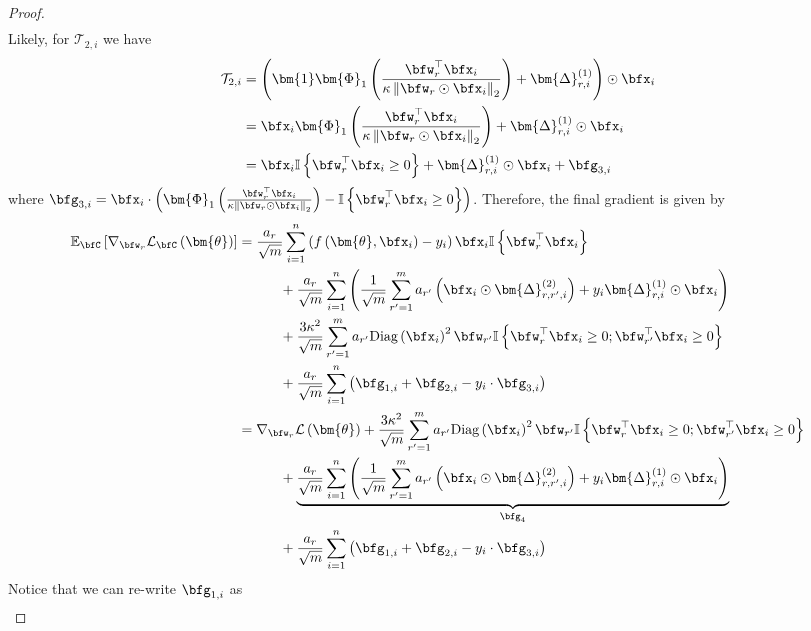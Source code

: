 \documentclass[10pt]{article} %
\theoremstyle{definition}
\theoremstyle{plain}
\newcommand{\paren}[1]{\left(#1\right)}
\newcommand{\norm}[1]{\left\|#1\right\|}
\newcommand{\indy}[1]{\mathbb{I}\left\{#1\right\}}
\providecommand{\E}{\mathbb{E}}
\def\calL{{\mathcal{L}}}
\begin{document}
\begin{proof}
\begin{gather*}
    \end{gather*}
    Likely, for $\mathcal{T}_{2,i}$ we have
    \begin{align*}
        \mathcal{T}_{2,i} & = \paren{\bm{1}\bm{\Phi}_1\paren{\frac{\bfw_r^\top\bfx_i}{\kappa\norm{\bfw_r\odot\bfx_i}_2}}+\bm{\Delta}^{(1)}_{r,i}}\odot\bfx_i\\
        & = \bfx_i\bm{\Phi}_1\paren{\frac{\bfw_r^\top\bfx_i}{\kappa\norm{\bfw_r\odot\bfx_i}_2}} + \bm{\Delta}^{(1)}_{r,i}\odot\bfx_i\\
        & = \bfx_i\indy{\bfw_r^\top\bfx_i\geq 0} + \bm{\Delta}^{(1)}_{r,i}\odot\bfx_i + \bfg_{3,i}
    \end{align*}
    where $\bfg_{3,i} = \bfx_i\cdot \paren{\bm{\Phi}_1\paren{\frac{\bfw_r^\top\bfx_i}{\kappa\norm{\bfw_r\odot\bfx_i}_2}} - \indy{\bfw_r^\top\bfx_i\geq 0}}$.
    Therefore, the final gradient is given by
    \begin{align*}
        \E_{\bfC}\left[\nabla_{\bfw_r}\calL_{\bfC}\paren{\bm{\theta}}\right] & = \frac{a_r}{\sqrt{m}}\sum_{i=1}^n\paren{f\paren{\bm{\theta},\bfx_i} -y_i}\bfx_i\mathbb{I}\left\{\bfw_{r}^\top\bfx_i\right\}\\
        &\quad\quad\quad + \frac{a_r}{\sqrt{m}}\sum_{i=1}^n\paren{\frac{1}{\sqrt{m}}\sum_{r'=1}^ma_{r'}\paren{\bfx_i\odot \bm{\Delta}_{r,r',i}^{(2)}} + y_i\bm{\Delta}^{(1)}_{r,i}\odot\bfx_i}\\
        &\quad\quad\quad + \frac{3\kappa^2}{\sqrt{m}}\sum_{r'=1}^ma_{r'}\text{Diag}\paren{\bfx_i}^2\bfw_{r'}\mathbb{I}\left\{\bfw_{r}^\top\bfx_i\geq 0;\bfw_{r'}^\top\bfx_i\geq 0\right\}\\
        & \quad\quad\quad + \frac{a_r}{\sqrt{m}}\sum_{i=1}^n\paren{\bfg_{1,i} + \bfg_{2,i} - y_i\cdot \bfg_{3,i}}\\
        & = \nabla_{\bfw_r}\calL\paren{\bm{\theta}} + \frac{3\kappa^2}{\sqrt{m}}\sum_{r'=1}^ma_{r'}\text{Diag}\paren{\bfx_i}^2\bfw_{r'}\mathbb{I}\left\{\bfw_{r}^\top\bfx_i\geq 0;\bfw_{r'}^\top\bfx_i\geq 0\right\}\\
        &\quad\quad\quad + \underbrace{\frac{a_r}{\sqrt{m}}\sum_{i=1}^n\paren{\frac{1}{\sqrt{m}}\sum_{r'=1}^ma_{r'}\paren{\bfx_i\odot \bm{\Delta}_{r,r',i}^{(2)}} + y_i\bm{\Delta}^{(1)}_{r,i}\odot\bfx_i}}_{\bfg_{4}}\\
        & \quad\quad\quad + \frac{a_r}{\sqrt{m}}\sum_{i=1}^n\paren{\bfg_{1,i} + \bfg_{2,i} - y_i\cdot \bfg_{3,i}}
    \end{align*}
    Notice that we can re-write $\bfg_{1,i}$ as
    \begin{align*}

\end{align*}
\end{proof}
\end{document}
